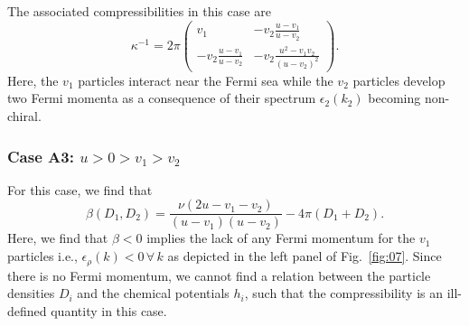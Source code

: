 \documentclass[aps,pra,
superscriptaddress,
reprint,twocolumn,preprintnumbers,
amsmath,amssymb,
nofootinbib]{revtex4-1}
\begin{document}
The associated compressibilities in this case are
        \begin{equation}
        \kappa^{-1} = 2 \pi \left( 
        \begin{array}{cc}
         v_1 & -v_2 \frac{u - v_1}{u - v_2} \\
         -v_2 \frac{u - v_1}{u - v_2} & - v_2 \frac{u^2 - v_1 v_2}{(u - v_2)^2}
        \end{array} \right).
        \end{equation}
Here, the $v_1$ particles interact near the Fermi sea while the $v_2$ particles develop two Fermi momenta as a consequence of their spectrum $\epsilon_2(k_2)$ becoming non-chiral. 
        
        \subsubsection{Case A3: $u>0>v_1>v_2$}
        \label{sec:A3}
        
For this case, we find that 
        \begin{equation}
        \beta(D_1,D_2) = \frac{\nu  \left(2 u-v_1-v_2\right)}{\left(u-v_1\right) \left(u-v_2\right)}-4 \pi  \left(D_1+D_2\right).
        \end{equation}        
Here, we find that $\beta<0$ implies the lack of any Fermi momentum for the $v_1$ particles i.e., $\epsilon_{\rho}(k)<0\, \forall\,k$ as depicted in the left panel of Fig.~\ref{fig:07}. Since there is no Fermi momentum, we cannot find a relation between the particle densities $D_i$ and the chemical potentials $h_i$, such that the compressibility is an ill-defined quantity in this case.   
\end{document}

